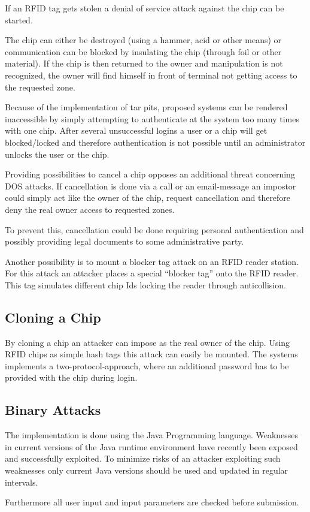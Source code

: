 \documentclass[12pt,a4paper,titlepage,oneside]{scrartcl}
\begin{document}
If an RFID tag gets stolen a denial of service attack against the chip can be started.

The chip can either be destroyed (using a hammer, acid or other means) or communication can be blocked by insulating the chip (through foil or other material). If the chip is then returned to the owner and manipulation is not recognized, the owner will find himself in front of terminal not getting access to the requested zone.

Because of the implementation of tar pits, proposed systems can be rendered inaccessible by simply attempting to authenticate at the system too many times with one chip. After several unsuccessful logins a user or a chip will get blocked/locked and therefore authentication is not possible until an administrator unlocks the user or the chip.

Providing possibilities to cancel a chip opposes an additional threat concerning DOS attacks. If cancellation is done via a call or an email-message an impostor could simply act like the owner of the chip, request cancellation and therefore deny the real owner access to requested zones.

To prevent this, cancellation could be done requiring personal authentication and possibly providing legal documents to some administrative party.

Another possibility is to mount a blocker tag attack on an RFID reader station. For this attack an attacker places a special “blocker tag” onto the RFID reader. This tag simulates different chip Ids locking the reader through anticollision.

\subsection{Cloning a Chip}

By cloning a chip an attacker can impose as the real owner of the chip. Using RFID chips as simple hash tags this attack can easily be mounted. The systems implements a two-protocol-approach, where an additional password has to be provided with the chip during login.

\subsection{Binary Attacks}

The implementation is done using the Java Programming language. Weaknesses in current versions of the Java runtime environment have recently been exposed and successfully exploited. To minimize risks of an attacker exploiting such weaknesses only current Java versions should be used and updated in regular intervals.

Furthermore all user input and input parameters are checked before submission.


%
%
\end{document}
